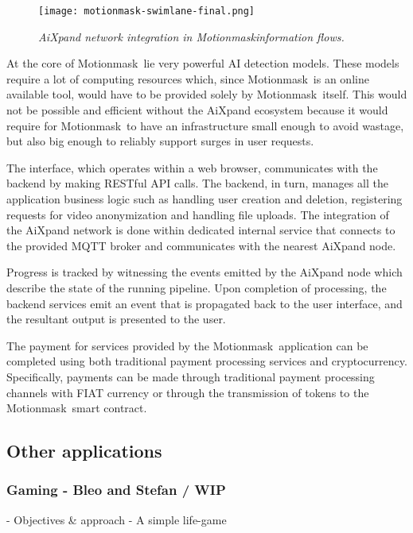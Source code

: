 \documentclass{article}
\begin{document}
\begin{figure}[htp]
    \centering
    \texttt{[image: motionmask-swimlane-final.png]}
    \caption{\textit{AiXpand network integration in Motionmask\texttrademark information flows.}}
    \label{fig:mm_swimlane}
\end{figure}

At the core of Motionmask\texttrademark\ lie very powerful AI detection models. These models require a lot of computing resources which, since Motionmask\texttrademark\ is an online available tool, would have to be provided solely by Motionmask\texttrademark\ itself. This would not be possible and efficient without the AiXpand ecosystem because it would require for Motionmask\texttrademark\ to have an infrastructure small enough to avoid wastage, but also big enough to reliably support surges in user requests. 

The interface, which operates within a web browser, communicates with the backend by making RESTful API calls. The backend, in turn, manages all the application business logic such as handling user creation and deletion, registering requests for video anonymization and handling file uploads. The integration of the AiXpand network is done within dedicated internal service that connects to the provided MQTT broker and communicates with the nearest AiXpand node. 

Progress is tracked by witnessing the events emitted by the AiXpand node which describe the state of the running pipeline. Upon completion of processing, the backend services emit an event that is propagated back to the user interface, and the resultant output is presented to the user.

The payment for services provided by the Motionmask\texttrademark\ application can be completed using both traditional payment processing services and cryptocurrency. Specifically, payments can be made through traditional payment processing channels with FIAT currency or through the transmission of tokens to the Motionmask\texttrademark\ smart contract.


\subsection{Other applications}
\subsubsection{Gaming - Bleo and Stefan / WIP}
 - Objectives \& approach
 - A simple life-game
\end{document}
